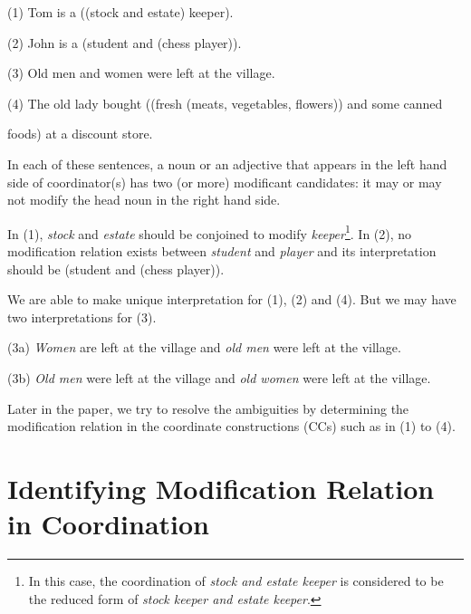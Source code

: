  \hspace*{5mm} (1) Tom is a ((stock and estate) keeper).

 \hspace*{5mm} (2) John is a (student and (chess player)).

 \hspace*{5mm} (3) Old men and women were left at the village. 

 \hspace*{5mm} (4) The old lady bought ((fresh (meats, vegetables, flowers)) and 
                   some canned 

 \vspace*{-1mm} \hspace*{10.5mm}foods) at a discount store.  

\vspace*{4mm} 
In each of these sentences, a noun or an adjective that appears in the
left hand side of coordinator(s) has two (or more) modificant candidates: it may or 
may not modify the head noun in the right hand side.

In (1), {\it stock} and {\it estate} should be conjoined to modify
{\it keeper}\footnote{In this case, the coordination
of {\it stock and estate keeper} is considered to be the reduced form
of {\it stock keeper and estate keeper}.}. In (2),  no modification 
relation exists between {\it student} and {\it player} and its 
interpretation should be (student and (chess player)).

  We are able to make unique interpretation for (1), (2) and (4).
But we may have two interpretations for (3).

 \vspace*{4mm}

 \hspace*{5mm} (3a) {\it Women} are left at the village and
 {\it old men} were left at the village.


 \hspace*{5mm} (3b) {\it Old men} were left at the village and
 {\it old women} were left at the village.


 \vspace*{4mm}

    Later in the paper, we try to resolve the ambiguities by determining the modification
relation in the coordinate constructions (CCs) such as in (1) to (4). 


\section{Identifying Modification Relation in Coordination}

